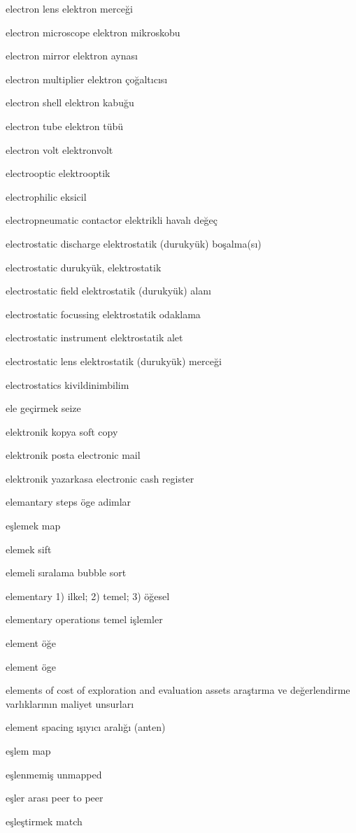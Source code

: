 \documentclass[12pt,fleqn]{article}\usepackage{../../common}
\begin{document}
electron lens elektron merceği

electron microscope elektron mikroskobu

electron mirror elektron aynası

electron multiplier elektron çoğaltıcısı

electron shell elektron kabuğu

electron tube elektron tübü

electron volt elektronvolt

electrooptic elektrooptik

electrophilic eksicil

electropneumatic contactor elektrikli havalı değeç

electrostatic discharge elektrostatik (durukyük) boşalma(sı)

electrostatic durukyük, elektrostatik

electrostatic field elektrostatik (durukyük) alanı

electrostatic focussing elektrostatik odaklama

electrostatic instrument elektrostatik alet

electrostatic lens elektrostatik (durukyük) merceği

electrostatics kivildinimbilim

ele geçirmek seize

elektronik kopya soft copy

elektronik posta electronic mail

elektronik yazarkasa electronic cash register

elemantary steps öge adimlar

eşlemek map

elemek sift

elemeli sıralama bubble sort

elementary 1) ilkel; 2) temel; 3) öğesel

elementary operations temel işlemler

element öğe

element öge

elements of cost of exploration and evaluation assets araştırma ve değerlendirme varlıklarının maliyet unsurları

element spacing ışıyıcı aralığı (anten)

eşlem map

eşlenmemiş unmapped

eşler arası peer to peer

eşleştirmek match
\end{document}
